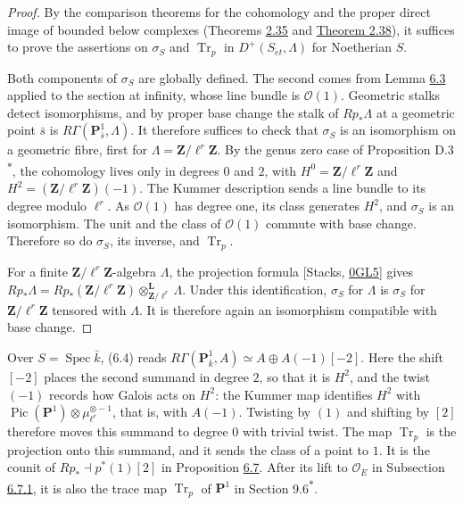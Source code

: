 \documentclass[11pt]{article}
\newcommand{\bpout}[1]{#1\textsuperscript{\hyperlink{bp-outside}{\ensuremath{\ast}}}}
\begin{document}
\begin{proof}[{Proof}]\label{bp527}%
By the comparison theorems for the cohomology and the proper direct image of bounded below complexes (Theorems \hyperref[bp103]{2.35} and \hyperref[bp113]{Theorem 2.38}), it suffices to prove the assertions on \(\sigma_S\) and \(\operatorname{Tr}_p\) in \(D^+(S_{\acute{e}t},\Lambda)\) for Noetherian \(S\).

Both components of \(\sigma_S\) are globally defined. The second comes from Lemma \hyperref[bp523]{6.3} applied to the section at infinity, whose line bundle is \(\mathcal O(1)\). Geometric stalks detect isomorphisms, and by proper base change the stalk of \(Rp_*\Lambda\) at a geometric point \(\bar s\) is \(R\Gamma(\mathbf P^1_{\bar s},\Lambda)\). It therefore suffices to check that \(\sigma_S\) is an isomorphism on a geometric fibre, first for \(\Lambda=\mathbf Z/\ell^r\mathbf Z\). By the genus zero case of Proposition \bpout{D.3}, the cohomology lives only in degrees \(0\) and \(2\), with \(H^0=\mathbf Z/\ell^r\mathbf Z\) and \(H^2=(\mathbf Z/\ell^r\mathbf Z)(-1)\). The Kummer description sends a line bundle to its degree modulo \(\ell^r\). As \(\mathcal O(1)\) has degree one, its class generates \(H^2\), and \(\sigma_S\) is an isomorphism. The unit and the class of \(\mathcal O(1)\) commute with base change. Therefore so do \(\sigma_S\), its inverse, and \(\operatorname{Tr}_p\).

For a finite \(\mathbf Z/\ell^r\mathbf Z\)-algebra \(\Lambda\), the projection formula [Stacks, \href{https://stacks.math.columbia.edu/tag/0GL5}{0GL5}] gives \(Rp_*\Lambda=Rp_*(\mathbf Z/\ell^r\mathbf Z)
\otimes^{\mathbf L}_{\mathbf Z/\ell^r}\Lambda\). Under this identification, \(\sigma_S\) for \(\Lambda\) is \(\sigma_S\) for \(\mathbf Z/\ell^r\mathbf Z\) tensored with \(\Lambda\). It is therefore again an isomorphism compatible with base change.
\end{proof}

\label{bp528}%
Over \(S=\operatorname{Spec}\bar k\), (6.4) reads \(R\Gamma(\mathbf P^1_{\bar k},A)\simeq A\oplus A(-1)[-2]\). Here the shift \([-2]\) places the second summand in degree \(2\), so that it is \(H^2\), and the twist \((-1)\) records how Galois acts on \(H^2\): the Kummer map identifies \(H^2\) with \(\operatorname{Pic}(\mathbf P^1)\otimes\mu_{\ell^r}^{\otimes-1}\), that is, with \(A(-1)\). Twisting by \((1)\) and shifting by \([2]\) therefore moves this summand to degree \(0\) with trivial twist. The map \(\operatorname{Tr}_p\) is the projection onto this summand, and it sends the class of a point to \(1\). It is the counit of \(Rp_*\dashv p^*(1)[2]\) in Proposition \hyperref[bp534]{6.7}. After its lift to \(\mathcal O_E\) in Subsection \hyperref[bp579]{6.7.1}, it is also the trace map \(\operatorname{Tr}_p\) of \(\mathbf P^1\) in Section \bpout{9.6}.
\end{document}
